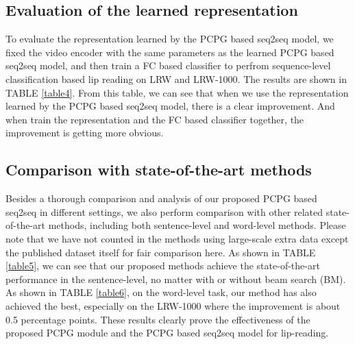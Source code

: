 \documentclass[a4paper, 10pt, conference]{ieeeconf}      %
\begin{document}
\subsection{Evaluation of the learned representation}
To evaluate the representation learned by the PCPG based seq2seq model, we fixed the video encoder with the same parameters as the learned PCPG based seq2seq model, and then train a FC based classifier to perfrom sequence-level classification based lip reading on LRW and LRW-1000. The results are shown in TABLE \ref{table4}. From this table, we can see that when we use the representation learned by  the PCPG based seq2seq model, there is a clear improvement. And when train the representation and the FC based classifier together, the improvement is getting more obvious.

\subsection{Comparison with state-of-the-art  methods}
Besides a thorough comparison and analysis of our proposed PCPG based seq2seq in different settings, we also perform comparison with other related state-of-the-art methods, including both sentence-level and word-level methods. Please note that we have not counted in the methods using large-scale extra data except the published dataset itself for fair comparison here. As shown in TABLE \ref{table5},  we can see that our proposed methods achieve the state-of-the-art performance in the sentence-level, no matter with or without beam search (BM). As shown in  TABLE \ref{table6}, on the word-level task, our method has also achieved the best, especially on the LRW-1000 where the improvement is about 0.5 percentage points. These results clearly prove the effectiveness of the proposed PCPG module and the PCPG based seq2seq model for lip-reading.
\end{document}
